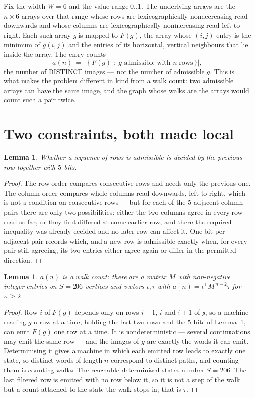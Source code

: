 \documentclass[11pt,a4paper]{article}
\theoremstyle{plain}
\newtheorem{lemma}[theorem]{Lemma}
\theoremstyle{definition}
\begin{document}
Fix the width $W=6$ and the value range $0..1$. The underlying arrays are the
$n\times6$ arrays over that range whose rows are lexicographically nondecreasing read downwards
and whose columns are lexicographically nonincreasing read left to right. Each such array $g$
is mapped to $F(g)$, the array whose $(i,j)$ entry is the minimum of $g(i,j)$ and the entries
of its horizontal, vertical neighbours that lie inside the array. The entry counts
\[
a(n)\;=\;\bigl|\{\,F(g)\;:\;g\text{ admissible with }n\text{ rows}\,\}\bigr|,
\]
the number of DISTINCT images --- not the number of admissible $g$. This is what makes the
problem different in kind from a walk count: two admissible arrays can have the same image, and
the graph whose walks are the arrays would count such a pair twice.

\section{Two constraints, both made local}

\begin{lemma}\label{lem:local}
Whether a sequence of rows is admissible is decided by the previous row together with
$5$ bits.
\end{lemma}

\begin{proof}
The row order compares consecutive rows and needs only the previous one. The column order
compares whole columns read downwards, left to right, which is not a condition on consecutive
rows --- but for each of the $5$ adjacent column pairs there are only two possibilities:
either the two columns agree in every row read so far, or they first differed at some earlier
row, and there the required inequality was already decided and no later row can affect it. One
bit per adjacent pair records which, and a new row is admissible exactly when, for every pair
still agreeing, its two entries either agree again or differ in the permitted direction.
\end{proof}

\begin{lemma}\label{lem:det}
$a(n)$ is a walk count: there are a matrix $M$ with non-negative integer entries on $S=206$
vertices and vectors $\iota,\tau$ with $a(n)=\iota^{\!\top}M^{\,n-2}\tau$ for $n\ge2$.
\end{lemma}

\begin{proof}
Row $i$ of $F(g)$ depends only on rows $i-1$, $i$ and $i+1$ of $g$, so a machine reading $g$ a
row at a time, holding the last two rows and the $5$ bits of Lemma~\ref{lem:local}, can
emit $F(g)$ one row at a time. It is nondeterministic --- several continuations may emit the
same row --- and the images of $g$ are exactly the words it can emit. Determinising it gives a
machine in which each emitted row leads to exactly one state, so distinct words of length $n$
correspond to distinct paths, and counting them is counting walks. The reachable determinised
states number $S=206$. The last filtered row is emitted with no row below it, so it is not a
step of the walk but a count attached to the state the walk stops in; that is $\tau$.
\end{proof}
\end{document}
